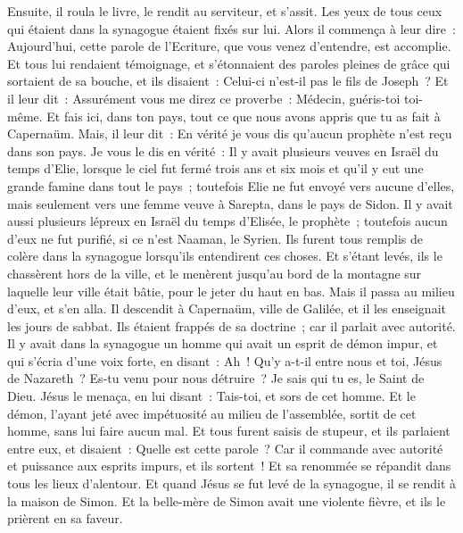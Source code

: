 \begin{multicols}{2}
Ensuite, il roula le livre, le rendit au serviteur, et s'assit. Les yeux de tous ceux qui étaient dans la synagogue étaient fixés sur lui.
Alors il commença à leur dire~: Aujourd'hui, cette parole de l'Ecriture, que vous venez d'entendre, est accomplie.
Et tous lui rendaient témoignage, et s'étonnaient des paroles pleines de grâce qui sortaient de sa bouche, et ils disaient~: Celui-ci n'est-il pas le fils de Joseph~?
Et il leur dit~: Assurément vous me direz ce proverbe~: Médecin, guéris-toi toi-même. Et fais ici, dans ton pays, tout ce que nous avons appris que tu as fait à Capernaüm.
Mais, il leur dit~: En vérité je vous dis qu'aucun prophète n'est reçu dans son pays.
Je vous le dis en vérité~: Il y avait plusieurs veuves en Israël du temps d'Elie, lorsque le ciel fut fermé trois ans et six mois et qu'il y eut une grande famine dans tout le pays~;
toutefois Elie ne fut envoyé vers aucune d'elles, mais seulement vers une femme veuve à Sarepta, dans le pays de Sidon.
Il y avait aussi plusieurs lépreux en Israël du temps d'Elisée, le prophète~; toutefois aucun d'eux ne fut purifié, si ce n'est Naaman, le Syrien.
Ils furent tous remplis de colère dans la synagogue lorsqu'ils entendirent ces choses.
Et s'étant levés, ils le chassèrent hors de la ville, et le menèrent jusqu'au bord de la montagne sur laquelle leur ville était bâtie, pour le jeter du haut en bas.
Mais il passa au milieu d'eux, et s'en alla.
Il descendit à Capernaüm, ville de Galilée, et il les enseignait les jours de sabbat.
Ils étaient frappés de sa doctrine~; car il parlait avec autorité.
Il y avait dans la synagogue un homme qui avait un esprit de démon impur, et qui s'écria d'une voix forte,
en disant~: Ah~! Qu'y a-t-il entre nous et toi, Jésus de Nazareth~? Es-tu venu pour nous détruire~? Je sais qui tu es, le Saint de Dieu.
Jésus le menaça, en lui disant~: Tais-toi, et sors de cet homme. Et le démon, l'ayant jeté avec impétuosité au milieu de l'assemblée, sortit de cet homme, sans lui faire aucun mal.
Et tous furent saisis de stupeur, et ils parlaient entre eux, et disaient~: Quelle est cette parole~? Car il commande avec autorité et puissance aux esprits impurs, et ils sortent~! 
Et sa renommée se répandit dans tous les lieux d'alentour.
Et quand Jésus se fut levé de la synagogue, il se rendit à la maison de Simon. Et la belle-mère de Simon avait une violente fièvre, et ils le prièrent en sa faveur.

\end{multicols}
